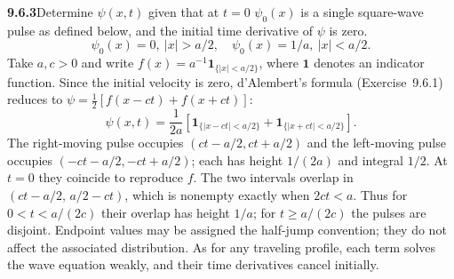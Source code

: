 \par\bigskip
\noindent\textbf{9.6.3}\quad Determine $\psi(x,t)$ given that at $t=0$
$\psi_{0}(x)$ is a single square-wave pulse as defined below, and the initial
time derivative of $\psi$ is zero.
\[
\psi_{0}(x)=0,\ |x|>a/2,\quad\psi_{0}(x)=1/a,\ |x|<a/2.
\]
\solution
Take $a,c>0$ and write
$f(x)=a^{-1}\mathbf1_{\{|x|<a/2\}}$, where $\mathbf1$ denotes an
indicator function.  Since the initial velocity is zero, d'Alembert's
formula (Exercise~9.6.1) reduces to $\psi=\tfrac12[f(x-ct)+f(x+ct)]$:
\[
\boxed{\psi(x,t)=\frac1{2a}
\left[\mathbf1_{\{|x-ct|<a/2\}}
     +\mathbf1_{\{|x+ct|<a/2\}}\right]}.
\]
The right-moving pulse occupies $(ct-a/2,ct+a/2)$ and the left-moving
pulse occupies $(-ct-a/2,-ct+a/2)$; each has height $1/(2a)$ and
integral $1/2$.  At $t=0$ they coincide to reproduce $f$.
The two intervals overlap in $(ct-a/2,\,a/2-ct)$, which is nonempty
exactly when $2ct<a$.  Thus for $0<t<a/(2c)$ their overlap has height
$1/a$; for $t\ge a/(2c)$ the pulses are disjoint.  Endpoint values may
be assigned the half-jump convention; they do not affect the associated
distribution.
As for any traveling profile, each term solves the wave equation
weakly, and their time derivatives cancel initially.

\begin{center}
\end{center}


